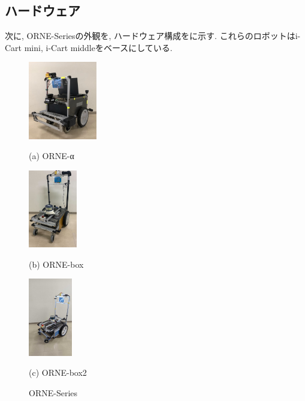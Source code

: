 \documentclass[uplatex, twocolumn, 9pt]{jsproceedings}
\begin{document}
\subsection{ハードウェア}
次に, ORNE-Seriesの外観を, ハードウェア構成をに示す. これらのロボットはi-Cart mini, i-Cart middleをベースにしている.

\begin{figure}[h]
  \centering
  \begin{minipage}[b]{0.3\linewidth}
    \centering
    \includegraphics[width=30mm]{fig/alpha.pdf}
    \caption*{(a) ORNE-α}
  \end{minipage} 
  \hspace{0.03\columnwidth}
  \begin{minipage}[b]{0.3\linewidth}
    \centering
    \includegraphics[height=34mm]{fig/boxkai.pdf}
    \caption*{(b) ORNE-box}
  \end{minipage}
  \begin{minipage}[b]{0.3\linewidth}
    \centering
    \includegraphics[height=34mm]{fig/box2kai.pdf}
    \caption*{(c) ORNE-box2}
  \end{minipage}
  \caption{ORNE-Series}
  \label{fig:orne-series}%
\end{figure}
\end{document}

